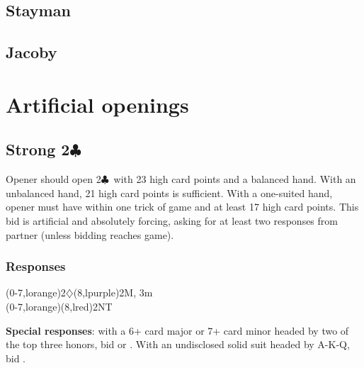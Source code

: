 \documentclass[oneside]{memoir}
\def\C{$\clubsuit$}
\def\D{$\diamondsuit$}
\begin{document}
\section{Stayman}

\section{Jacoby}


\chapter{Artificial openings}

\section{Strong 2\C}

Opener should open 2\C\ with 23 high card points and a balanced hand.
With an unbalanced hand, 21 high card points is sufficient.  With a
one-suited hand, opener must have within one trick of game and at least
17 high card points.  This bid is artificial and absolutely forcing,
asking for at least two responses from partner (unless bidding
reaches game).

\subsection{Responses}
\begin{ptable}
\bid*(0-7,lorange){2\D{}}\bid(8,lpurple){2M, 3m}\\
\bid(0-7,lorange){\clift{2\D}}\bid(8,lred){2NT}\\
\end{ptable}
\hskip 1pc\vrule\hskip 1pc
\parbox[t]{4in}{\vskip -1.4pc %
\textbf{Special responses}: with a 6+ card major or 7+ card minor headed by two
of the top three honors, bid  or
.  With an undisclosed solid suit headed by A-K-Q,
bid .  }
\end{document}
